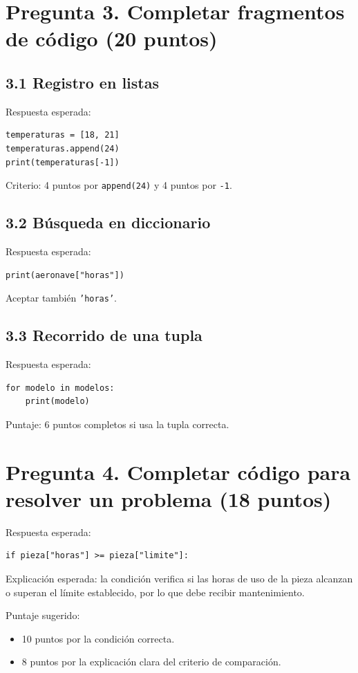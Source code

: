 \documentclass[12pt]{article}
\begin{document}
\section*{Pregunta 3. Completar fragmentos de c\'odigo (20 puntos)}
\subsection*{3.1 Registro en listas}
Respuesta esperada:
\begin{verbatim}
temperaturas = [18, 21]
temperaturas.append(24)
print(temperaturas[-1])
\end{verbatim}
Criterio: 4 puntos por \texttt{append(24)} y 4 puntos por \texttt{-1}.

\subsection*{3.2 B\'usqueda en diccionario}
Respuesta esperada:
\begin{verbatim}
print(aeronave["horas"])
\end{verbatim}
Aceptar tambi\'en \texttt{'horas'}.

\subsection*{3.3 Recorrido de una tupla}
Respuesta esperada:
\begin{verbatim}
for modelo in modelos:
    print(modelo)
\end{verbatim}
Puntaje: 6 puntos completos si usa la tupla correcta.

\section*{Pregunta 4. Completar c\'odigo para resolver un problema (18 puntos)}
Respuesta esperada:
\begin{verbatim}
if pieza["horas"] >= pieza["limite"]:
\end{verbatim}
Explicaci\'on esperada: la condici\'on verifica si las horas de uso de la pieza alcanzan o superan el l\'imite establecido, por lo que debe recibir mantenimiento.

Puntaje sugerido:
\begin{itemize}[leftmargin=1.2em]
    \item 10 puntos por la condici\'on correcta.
    \item 8 puntos por la explicaci\'on clara del criterio de comparaci\'on.
\end{itemize}
\end{document}
